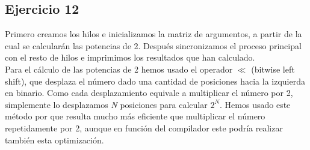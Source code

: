 \documentclass[]{article}
\begin{document}
\subsection*{Ejercicio 12}
Primero creamos los hilos e inicializamos la matriz de argumentos, a partir de la cual se calcularán las potencias de 2. Después sincronizamos el proceso principal con el resto de hilos e imprimimos los resultados que han calculado. \\

Para el cálculo de las potencias de 2 hemos usado el operador $\ll$ (bitwise left shift), que desplaza el número dado una cantidad de posiciones hacia la izquierda en binario. Como cada desplazamiento equivale a multiplicar el número por 2, simplemente lo desplazamos \textit{N} posiciones para calcular \textit{$2^N$}. Hemos usado este método por que resulta mucho más eficiente que multiplicar el número repetidamente por 2, aunque en función del compilador este podría realizar también esta optimización.
\end{document}
